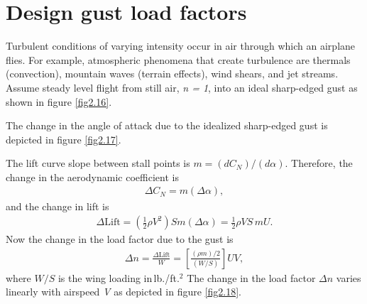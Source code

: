 \documentclass{AeroStructure-ERJohnson}
\begin{document}
\section{Design gust load factors}\label{sec2.5}

Turbulent conditions of varying intensity occur in air through which an airplane flies. For example, atmospheric phenomena that create turbulence are thermals (convection), mountain waves (terrain effects), wind shears, and jet streams. Assume steady level flight from still air, \textit{n = 1}, into an ideal sharp-edged gust as shown in figure \ref{fig2.16}\vadjust{\vfill\pagebreak}.

{\def\thefigure{2.16}
}


The change in the angle of attack due to the idealized sharp-edged gust is depicted in figure \ref{fig2.17}.

{\def\thefigure{2.17}
}


The lift curve slope between stall points is $m=\left(d C_{N}\right) /(d \alpha)$. Therefore, the change in the aerodynamic coefficient is
\begin{align}\label{eq2.47}
\Delta C_{N}=m(\Delta \alpha),
\end{align}
and the change in lift is
\begin{align}\label{eq2.48}
\Delta \mathrm{Lift}=\left(\frac{1}{2} \rho V^{2}\right) S m(\Delta \alpha)=\frac{1}{2} \rho V S\,m U.
\end{align}
Now the change in the load factor due to the gust is
\begin{align}\label{eq2.49}
\Delta n=\frac{\Delta \mathrm{Lift}}{W}=\left[\frac{(\rho m)/2}{(W/S)}\right] U V,
\end{align}
where $W/S$ is the wing loading in\,lb./ft.$^2$ The change in the load factor $\Delta n$ varies linearly with airspeed \textit{V} as depicted in figure \ref{fig2.18}.
\end{document}
